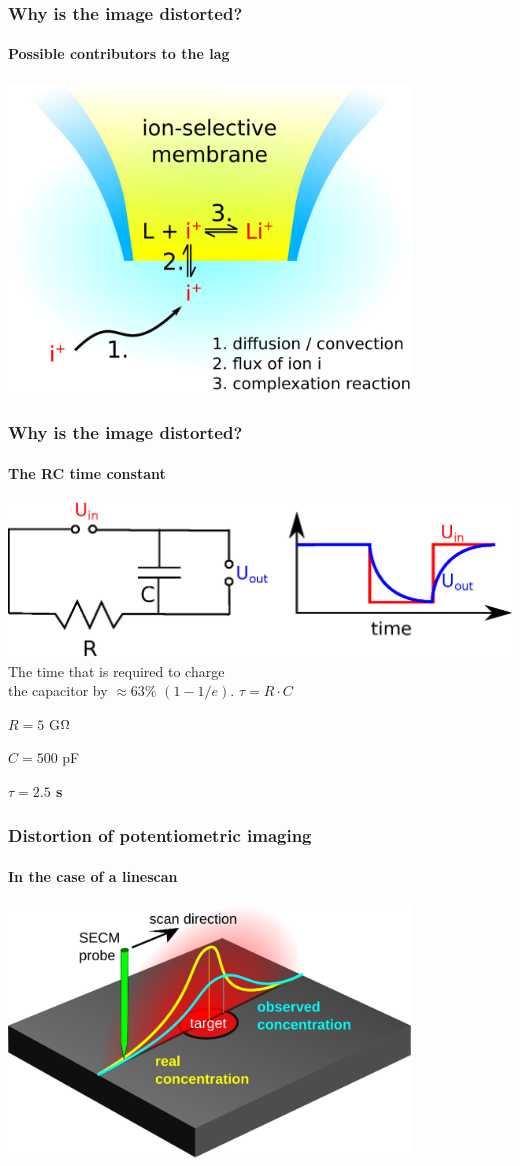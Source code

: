 \documentclass{beamer}
\begin{document}
\begin{frame}
\frametitle{Why is the image distorted?}
\framesubtitle{Possible contributors to the lag}
\centering
\includegraphics[width=0.8\textwidth]{npp.eps}
\end{frame}

\begin{frame}
	\frametitle{Why is the image distorted?}
	\framesubtitle{The RC time constant} 
	\centering
	\includegraphics[width=1\textwidth]{RC.eps}
	\vfill
	The time that is required to charge \\ the capacitor by $\approx 63\%$ $(1-1/e)$.	
	\vfill
	$\tau = R \cdot C$
	
	$R = 5 $ G$\ohm$
	
	$C = 500 $ pF
	
	\textbf{\textcolor{white!100}{\colorbox{red!100}{$\tau = 2.5 $ s}}}

\end{frame}

\begin{frame}
	\frametitle{Distortion of potentiometric imaging} 
	\framesubtitle{In the case of a linescan} 
	\centering
	\includegraphics[width=0.8\textwidth]{distortion2.eps}
\end{frame}
\end{document}

